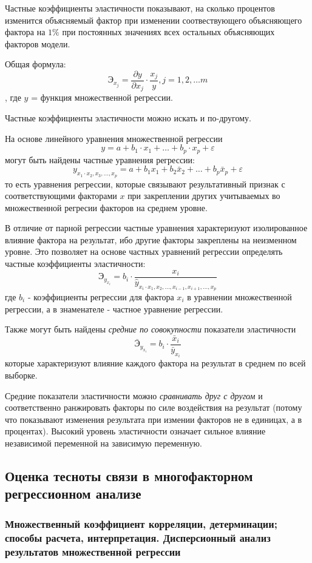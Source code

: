 \documentclass[aps,%
12pt,%
final,%
oneside,
onecolumn,%
musixtex, %
superscriptaddress,%
centertags]{article} %
\theoremstyle{plain}
\theoremstyle{definition}
\theoremstyle{remark}
\begin{document}
Частные коэффициенты эластичности показывают, на сколько процентов изменится объясняемый фактор при изменении соотвествующего объясняющего фактора на $1\%$ при постоянных значениях всех остальных объясняющих факторов модели.

Общая формула:
$$\text{Э}_{x_j} = \frac{\partial y}{\partial x_j} \cdot \frac{x_j}{y}, j = 1,2,\ldots m$$, где $y$ = функция множественной регрессии.

Частные коэффициенты эластичности можно искать и по-другому.

На основе линейного уравнения множественной регрессии 
$$y=a+b_1 \cdot x_1 + \ldots + b_p \cdot x_p + \varepsilon$$ 
могут быть найдены частные уравнения регрессии:
$$y_{x_1 \cdot x_2,x_3,\ldots,x_p} = a+b_1x_1 + b_2 \bar{x}_2 + \ldots +  b_p \bar{x}_p + \varepsilon$$
то есть уравнения регрессии, которые связывают результативный признак с соответствующими факторами $x$ при закреплении других учитываемых во множественной регресии факторов на среднем уровне. 

В отличие от парной регрессии частные уравнения характеризуют изолированное влияние фактора на результат, ибо другие факторы закреплены на неизменном уровне. Это позволяет на основе частных уравнений регрессии определять частные коэффициенты эластичности:
$$\text{Э}_{y_{x_i}} = b_i \cdot \frac{x_i}{\hat{y}_{x_i \cdot x_1,x_2,\ldots,x_{i-1},x_{i+1},\ldots,x_p}}$$
где $b_i$ - коэффициенты регрессии для фактора $x_i$ в уравнении множественной регрессии, а в знаменателе - частное уравнение регрессии.

Также могут быть найдены \textit{средние по совокупности} показатели эластичности
$$\bar{\text{Э}}_{y_{x_i}} = b_i \cdot \frac{\bar{x}_i}{\bar{y}_{x_i}}$$
которые характеризуют влияние каждого фактора на результат в среднем по всей выборке.

Средние показатели эластичности можно \textit{сравнивать друг с другом} и соответственно ранжировать факторы по силе воздействия на результат (потому что показывают изменения результата при измении факторов не в единицах, а в процентах). Высокий уровень эластичности означает сильное влияние независимой переменной на зависимую переменную.


\newpage

\subsection{Оценка тесноты связи в многофакторном регрессионном анализе}

\subsubsection{Множественный коэффициент корреляции, детерминации; способы расчета, интерпретация. Дисперсионный анализ результатов множественной регрессии}
\end{document}
